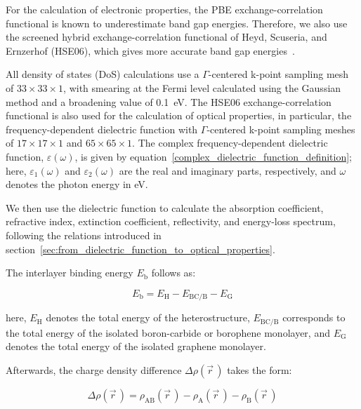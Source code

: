 For the calculation of electronic properties,
the PBE exchange-correlation functional is known to underestimate band gap energies.
Therefore, we also use the screened hybrid exchange-correlation functional of Heyd, Scuseria, and Ernzerhof (HSE06),
which gives more accurate band gap energies~\cite{sassnick2021electronic, heyd2003hybrid, krukau2006influence}.

All density of states (DoS) calculations use a $\Gamma$-centered k-point sampling mesh of $33 \times 33 \times 1$,
with smearing at the Fermi level calculated using the Gaussian method and a broadening value of \qty{0.1}{\electronvolt}.
The HSE06 exchange-correlation functional is also used for the calculation of optical properties,
in particular, the frequency-dependent dielectric function with $\Gamma$-centered k-point sampling meshes of $17 \times 17 \times 1$ and $65 \times 65 \times 1$.
The complex frequency-dependent dielectric function, $\varepsilon(\omega)$,
is given by equation~\ref{complex_dielectric_function_definition};
here, $\varepsilon_{1}(\omega)$ and $\varepsilon_{2}(\omega)$ are the real and imaginary parts, respectively, and $\omega$ denotes the photon energy in \unit{\electronvolt}.

We then use the dielectric function to calculate the absorption coefficient,
refractive index, extinction coefficient, reflectivity, and energy-loss spectrum,
following the relations introduced in section~\ref{sec:from_dielectric_function_to_optical_properties}.

The interlayer binding energy $E_{\mathrm{b}}$ follows as:

\begin{equation}
E_{\mathrm{b}}
= E_{\mathrm{H}} - E_{\mathrm{BC}/\mathrm{B}} - E_{\mathrm{G}}
\label{interlayer_binding_energy}
\end{equation}

here, $E_{\mathrm{H}}$ denotes the total energy of the heterostructure,
$E_{\mathrm{BC}/\mathrm{B}}$ corresponds to the total energy of the isolated boron-carbide or borophene monolayer,
and $E_{\mathrm{G}}$ denotes the total energy of the isolated graphene monolayer.

Afterwards, the charge density difference $\Delta \rho(\vec{r}\,)$ takes the form:

\begin{equation}
\Delta \rho(\vec{r}\,) =
\rho_{\mathrm{AB}}(\vec{r}\,)
- \rho_{\mathrm{A}}(\vec{r}\,)
- \rho_{\mathrm{B}}(\vec{r}\,)
\label{charge_density_difference}
\end{equation}

